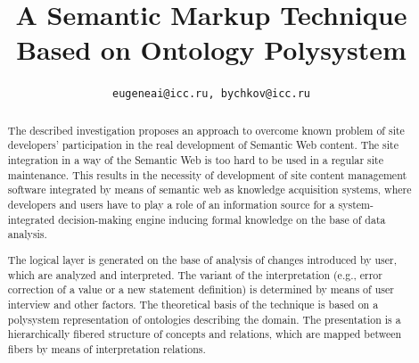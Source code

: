\documentclass[conference]{IEEEtran}
\begin{document}
\title{A Semantic Markup Technique Based on Ontology Polysystem}
  \author{%
\texttt{\small eugeneai@icc.ru, bychkov@icc.ru}
}


\maketitle

\def\thepage{Page \arabic{page}}

\begin{abstract}
The described investigation proposes an approach to overcome known problem of site developers' participation in the real development of Semantic Web content.  The site integration in a way of the Semantic Web is too hard to be used in a regular site maintenance.  This results in the necessity of development of site content management software integrated by means of semantic web as knowledge acquisition systems, where developers and users have to play a role of an information source for a system-integrated decision-making engine inducing formal knowledge on the base of data analysis.

The logical layer is generated on the base of analysis of changes introduced by user, which are analyzed and interpreted.  The variant of the interpretation (e.g., error correction of a value or a new statement definition) is determined by means of user interview and other factors.  The theoretical basis of the technique is based on a polysystem representation of ontologies describing the domain.  The presentation is a hierarchically fibered structure of concepts and relations, which are mapped between fibers by means of interpretation relations.
\end{abstract}


%
\IEEEpeerreviewmaketitle
\end{document}
